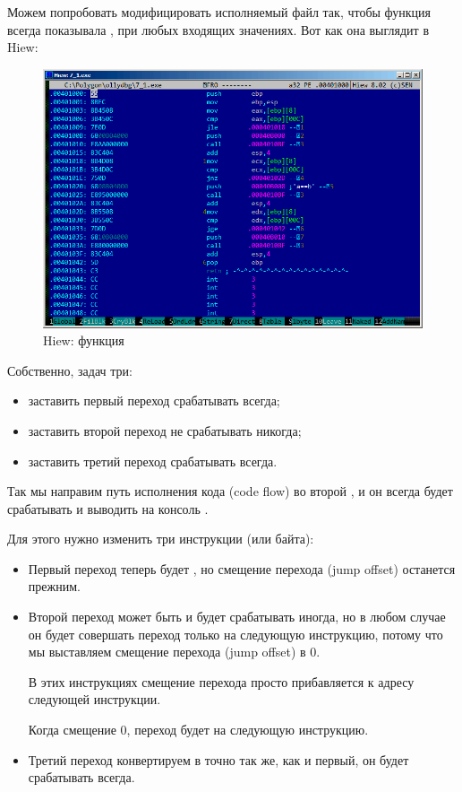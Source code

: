 

\clearpage
{}

Можем попробовать модифицировать исполняемый файл так, чтобы функция  всегда показывала ,
при любых входящих значениях.
Вот как она выглядит в Hiew:

\begin{figure}[H]
\centering
\includegraphics[scale=\FigScale]{patterns/07_jcc/simple/hiew_unsigned1.png}
\caption{Hiew: функция }
\label{fig:jcc_hiew_1}
\end{figure}

Собственно, задач три:
\begin{itemize}
\item заставить первый переход срабатывать всегда;
\item заставить второй переход не срабатывать никогда;
\item заставить третий переход срабатывать всегда.
\end{itemize}

Так мы направим путь исполнения кода (code flow) во второй \printf,
и он всегда будет срабатывать и выводить на консоль .

Для этого нужно изменить три инструкции (или байта):

\begin{itemize}
\item Первый переход теперь будет \JMP, но смещение перехода 
(\gls{jump offset}) останется прежним.

\item Второй переход может быть и будет срабатывать иногда, но в любом случае он будет совершать переход
только на следующую инструкцию, потому что мы выставляем смещение перехода (\gls{jump offset}) в 0.

В этих инструкциях смещение перехода просто прибавляется к адресу следующей инструкции.

Когда смещение 0, переход будет на следующую инструкцию.

\item Третий переход конвертируем в \JMP точно так же, как и первый, он будет срабатывать всегда.

\end{itemize}

